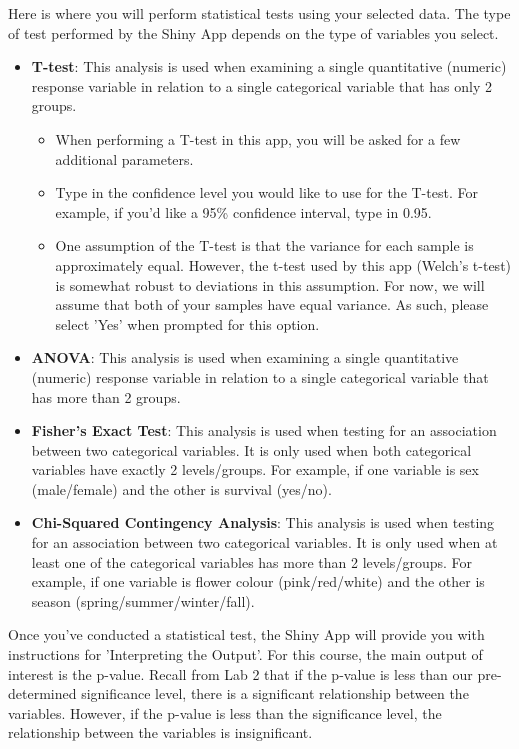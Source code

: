 \documentclass[
]{book}
\providecommand{\tightlist}{%
  \setlength{\itemsep}{0pt}\setlength{\parskip}{0pt}}
\begin{document}
Here is where you will perform statistical tests using your selected data. The type of test performed by the Shiny App depends on the type of variables you select.

\begin{itemize}
\tightlist
\item
  \textbf{T-test}: This analysis is used when examining a single quantitative (numeric) response variable in relation to a single categorical variable that has only 2 groups.

  \begin{itemize}
  \tightlist
  \item
    When performing a T-test in this app, you will be asked for a few additional parameters.
  \item
    Type in the confidence level you would like to use for the T-test. For example, if you'd like a 95\% confidence interval, type in 0.95.
  \item
    One assumption of the T-test is that the variance for each sample is approximately equal. However, the t-test used by this app (Welch's t-test) is somewhat robust to deviations in this assumption. For now, we will assume that both of your samples have equal variance. As such, please select 'Yes' when prompted for this option.
  \end{itemize}
\item
  \textbf{ANOVA}: This analysis is used when examining a single quantitative (numeric) response variable in relation to a single categorical variable that has more than 2 groups.
\item
  \textbf{Fisher's Exact Test}: This analysis is used when testing for an association between two categorical variables. It is only used when both categorical variables have exactly 2 levels/groups. For example, if one variable is sex (male/female) and the other is survival (yes/no).
\item
  \textbf{Chi-Squared Contingency Analysis}: This analysis is used when testing for an association between two categorical variables. It is only used when at least one of the categorical variables has more than 2 levels/groups. For example, if one variable is flower colour (pink/red/white) and the other is season (spring/summer/winter/fall).
\end{itemize}

Once you've conducted a statistical test, the Shiny App will provide you with instructions for 'Interpreting the Output'. For this course, the main output of interest is the p-value. Recall from Lab 2 that if the p-value is less than our pre-determined significance level, there is a significant relationship between the variables. However, if the p-value is less than the significance level, the relationship between the variables is insignificant.
\end{document}
